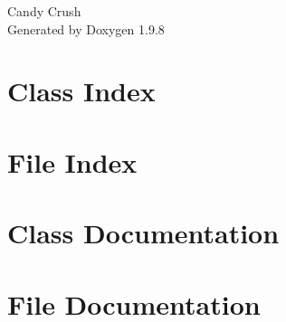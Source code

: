 \documentclass[twoside]{book}
\newcommand{\+}{\discretionary{\mbox{\scriptsize$\hookleftarrow$}}{}{}}
\newcommand{\clearemptydoublepage}{%
    \newpage{\pagestyle{empty}\cleardoublepage}%
  }
\begin{document}
  \raggedbottom
    \hypersetup{pageanchor=false,
                bookmarksnumbered=true,
                pdfencoding=unicode
               }
  \begin{titlepage}
  \vspace*{7cm}
  \begin{center}%
  {\Large Candy Crush}\\
  \vspace*{1cm}
  {\large Generated by Doxygen 1.9.8}\\
  \end{center}
  \end{titlepage}
  \clearemptydoublepage
  \tableofcontents
  \clearemptydoublepage
  \hypersetup{pageanchor=true}
\chapter{Class Index}

\chapter{File Index}

\chapter{Class Documentation}

\chapter{File Documentation}


  \backmatter
  \newpage
  \clearemptydoublepage
  \printindex
\end{document}
